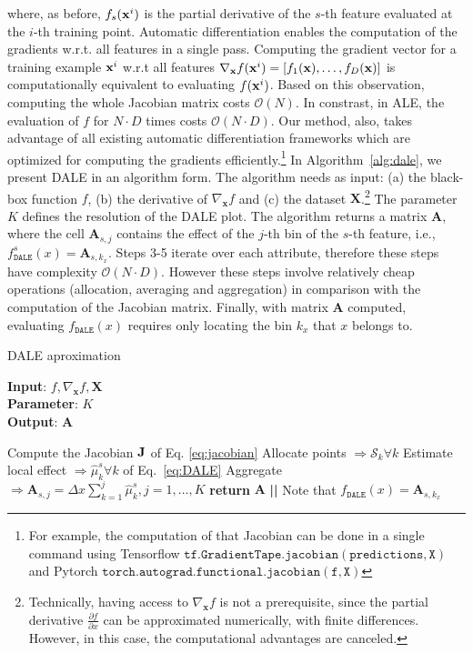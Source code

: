 \noindent
where, as before, \( f_s(\mathbf{x}^i) \) is the partial derivative of the
\(s\)-th feature evaluated at the \(i\)-th training point. Automatic
differentiation enables the computation of the gradients w.r.t. all
features in a single pass. Computing the gradient vector for a
training example \(\mathbf{x}^i\) w.r.t all features
\( \nabla_{\mathbf{x}}f(\mathbf{x}^i) = [f_1(\mathbf{x}), \ldots, f_D(\mathbf{x})] \) is
computationally equivalent to evaluating \(f(\mathbf{x}^i)\). Based on this
observation, computing the whole Jacobian matrix costs
\(\mathcal{O}(N)\). In constrast, in ALE, the evaluation of \(f\) for
\(N \cdot D\) times costs \(\mathcal{O}(N \cdot D)\). Our method,
also, takes advantage of all existing automatic differentiation
frameworks which are optimized for computing the gradients
efficiently.\footnote{For example, the computation of that Jacobian
  can be done in a single command using Tensorflow
  \( \mathtt{tf.GradientTape.jacobian(predictions, X)} \) and Pytorch
  \( \mathtt{torch.autograd.functional.jacobian(f, X)} \)} In
Algorithm~\ref{alg:dale}, we present DALE in an algorithm form. The
algorithm needs as input: (a) the black-box function \(f\), (b) the
derivative of \(\nabla_{\mathbf{x}} f \) and (c) the dataset
\( \mathbf{X} \).\footnote{Technically, having access to
  \(\nabla_{\mathbf{x}} f \) is not a prerequisite, since the partial
  derivative \(\frac{\partial f}{\partial x}\) can be approximated
  numerically, with finite differences. However, in this case, the
  computational advantages are canceled.} The parameter \( K \)
defines the resolution of the DALE plot. The algorithm returns a
matrix \(\mathbf{A}\), where the cell \(\mathbf{A}_{s,j}\) contains
the effect of the \(j\)-th bin of the \(s\)-th feature, i.e.,
\(f_{\mathtt{DALE}}^s(x) = \mathbf{A}_{s,k_x} \). Steps 3-5 iterate
over each attribute, therefore these steps have complexity
\(\mathcal{O}(N \cdot D)\). However these steps involve relatively
cheap operations (allocation, averaging and aggregation) in comparison
with the computation of the Jacobian matrix. Finally, with matrix
\(\mathbf{A}\) computed, evaluating \(f_{\mathtt{DALE}}(x)\) requires
only locating the bin \(k_x\) that \( x \) belongs to.

\begin{algorithm}[h]
\caption{DALE aproximation}
\label{alg:dale}
\textbf{Input}: \( f, \nabla_{\mathbf{x}} f, \mathbf{X} \) \\
\textbf{Parameter}: \( K \) \\
\textbf{Output}: \(\mathbf{A}\)
\begin{algorithmic}[1] %
\STATE Compute the Jacobian \(\mathbf{J}\) of Eq. \eqref{eq:jacobian}
\STATE Allocate points \( \Rightarrow \mathcal{S}_k \forall k \)
\STATE Estimate local effect \( \Rightarrow \hat{\mu}_k^s \forall k\) of Eq.~\eqref{eq:DALE}
\STATE Aggregate \( \Rightarrow \mathbf{A}_{s,j} = \Delta x\sum_{k=1}^{j} \hat{\mu}_k^s, j =  1, \ldots, K \)
\ENDFOR
\STATE \textbf{return} \(\mathbf{A}\) \textbf{||} Note that \( f_{\mathtt{DALE}}(x) = \mathbf{A}_{s,k_x} \)
\end{algorithmic}
\end{algorithm}
